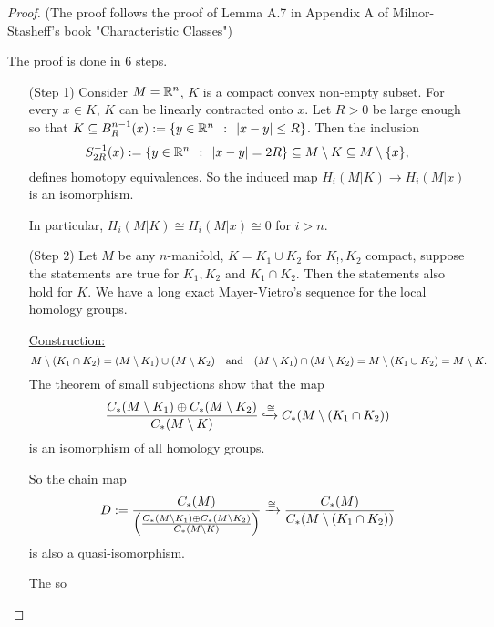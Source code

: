 \documentclass[a4paper,11pt,english]{article}
\begin{document}
\begin{proof}
(The proof follows the proof of Lemma A.7 in Appendix A of Milnor-Stasheff's
book "Characteristic Classes")

The proof is done in 6 steps.

\begin{enumerate}
\item[(Step 1)] Consider $M = \R^n$, $K$ is a compact convex non-empty subset.
For every $x \in K$, $K$ can be linearly contracted onto $x$. Let $R > 0$ be
large enough so that $K \subseteq B^{n-1}_R(x) := \{ y \in \R^n \q: |x-y| \le R
\}$. Then the inclusion
\[ S^{-1}_{2R}(x) := \{ y \in \R^n \q: |x-y| = 2R \} \subseteq M\setminus K
\subseteq M \setminus \{ x \}, \]
defines homotopy equivalences. So the induced map $H_i(M|K) \to
H_i(M|x)$ is an isomorphism.

In particular, $H_i(M|K) \cong H_i(M|x) \cong 0$ for $i > n$.

\item[(Step 2)]
Let $M$ be any $n$-manifold, $K = K_1 \cup K_2$ for $K_!, K_2$ compact, suppose
the statements are true for $K_1, K_2$ and $K_1 \cap K_2$. Then the statements
also hold for $K$. We have a long exact Mayer-Vietro's sequence for the local
homology groups. 

\underline{Construction:}
\[ M \setminus (K_1 \cap K_2) = (M\setminus K_1) \cup (M \setminus K_2)
\qq{\text{and}} (M\setminus K_1) \cap (M \setminus K_2) = M \setminus (K_1 \cup
K_2) = M \setminus K. \]
The theorem of small subjections show that the map 
\[ \frac{C_*(M\setminus K_1) \oplus C_*(M\setminus K_2)}{C_*(M\setminus K)}
\incto[\cong] C_*(M \setminus (K_1 \cap K_2)) \]
is an isomorphism of all homology groups.

So the chain map
\[  D := \frac{C_*(M)}{ \left( \frac{C_*(M\setminus K_1) \oplus C_*(M\setminus
K_2)}{C_*(M\setminus K)} \right) } \congto \frac{C_*(M)}{C_*(M\setminus
(K_1 \cap K_2))} \]
is also a quasi-isomorphism.

The so
\end{enumerate}
\end{proof}
\end{document}
